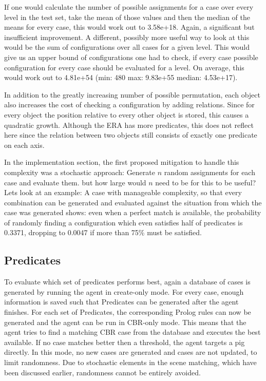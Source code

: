 If one would calculate the number of possible assignments for a case over every level in the test set, take the mean of those values and then the median of the means for every case, this would work out to 3.58e+18. Again, a significant but insufficient improvement.
A different, possibly more useful way to look at this would be the sum of configurations over all cases for a given level. This would give us an upper bound of configurations one had to check, if every case possible configuration for every case should be evaluated for a level. On average, this would work out to 4.81e+54 (min: 480 max: 9.83e+55 median: 4.53e+17).

In addition to the greatly increasing number of possible permutation, each object also increases the cost of checking a configuration by adding relations.
Since for every object the position relative to every other object is stored, this causes a quadratic growth. Although the ERA has more predicates, this does not reflect here since the relation between two objects still consists of exactly one predicate on each axis.

In the implementation section, the first proposed mitigation to handle this complexity was a stochastic approach: Generate $n$ random assignments for each case and evaluate them. but how large would $n$ need to be for this to be useful?
Lets look at an example: A case with manageable complexity, so that every combination can be generated and evaluated against the situation from which the case was generated shows: even when a perfect match is available, the probability of randomly finding a configuration which even satisfies half of predicates is 0.3371, dropping to 0.0047 if more than 75\% must be satisfied.




\subsection{Predicates}
To evaluate which set of predicates performs best, again a database of cases is generated by running the agent in create-only mode.
For every case, enough information is saved such that Predicates can be generated after the agent finishes. For each set of Predicates, the corresponding Prolog rules can now be generated and the agent can be run in CBR-only mode. This means that the agent tries to find a matching CBR case from the database and executes the best available. If no case matches better then a threshold, the agent targets a pig directly. In this mode, no new cases are generated and cases are not updated, to limit randomness. Due to stochastic elements in the scene matching, which have been discussed earlier, randomness cannot be entirely avoided.

